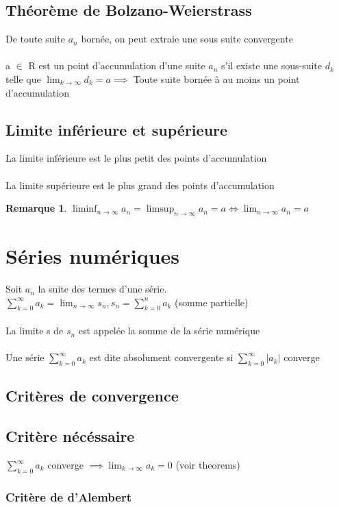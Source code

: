 \documentclass{article}
\newtheorem{remark}{Remarque}[section]
\begin{document}
\subsection{Théorème de Bolzano-Weierstrass}
De toute suite $a_n$ bornée, on peut extraie une sous suite convergente \\\\
a $\in$ R est un point d'accumulation d'une suite $a_n$ s'il existe une sous-suite $d_k$ telle que $\lim_{k\to\infty}d_k = a \implies$  Toute suite bornée à au moins un point d'accumulation

\subsection{Limite inférieure et supérieure}
La limite inférieure est le plus petit des points d'accumulation \\\\
La limite supérieure est le plus grand des points d'accumulation
\begin{remark}
    $\liminf_{n\to\infty}a_n = \limsup_{n\to\infty}a_n = a \Leftrightarrow \lim_{n\to\infty}a_n = a$
\end{remark}

\section{Séries numériques}

Soit $ a_n $ la suite des termes d'une série. \\
$\sum_{k=0}^{\infty}a_k = \lim_{n\to\infty}s_n, s_n = \sum_{k=0}^{n}a_k$ (somme partielle) \\\\
La limite s de $s_n$ est appelée la somme de la série numérique \\\\
Une série $\sum_{k=0}^{\infty}a_k $ est dite absolument convergente si $\sum_{k=0}^{\infty}|a_k| $ converge
\subsection{Critères de convergence}
\subsection{Critère nécéssaire}
$\sum_{k=0}^{\infty}a_k$ converge $\implies \lim_{k\to\infty}a_k = 0$ (voir theorems)
\subsubsection{Critère de d'Alembert}
\end{document}
